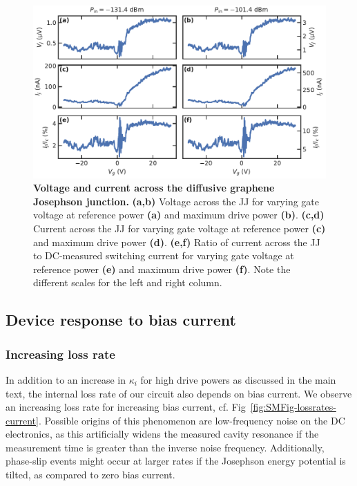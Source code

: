 \begin{figure}
	\centering
	\includegraphics[width=\linewidth]{chapter-gJJ-CPR/figs/SMFigure-poweratJJ}
	\caption{
		\textbf{Voltage and current across the diffusive graphene Josephson junction.}
		\textbf{(a,b)} Voltage across the JJ for varying gate voltage at reference power \textbf{(a)} and maximum drive power \textbf{(b)}.
		\textbf{(c,d)} Current across the JJ for varying gate voltage at reference power \textbf{(c)} and maximum drive power \textbf{(d)}.
		\textbf{(e,f)} Ratio of current across the JJ to DC-measured switching current for varying gate voltage at reference power \textbf{(e)} and maximum drive power \textbf{(f)}.
		Note the different scales for the left and right column.
	}
	\label{fig:SMFigpoweratJJ}
\end{figure}

\subsection{Device response to bias current}\label{sec:SMfitbiascurrent}
\subsubsection{Increasing loss rate}
In addition to an increase in $\kappa_i$ for high drive powers as discussed in the main text, the internal loss rate of our circuit also depends on bias current.
%
We observe an increasing loss rate for increasing bias current, cf. Fig~\ref{fig:SMFig-lossrates-current}.
%
Possible origins of this phenomenon are low-frequency noise on the DC electronics, as this artificially widens the measured cavity resonance if the measurement time is greater than the inverse noise frequency.
%
Additionally, phase-slip events might occur at larger rates if the Josephson energy potential is tilted, as compared to zero bias current.

